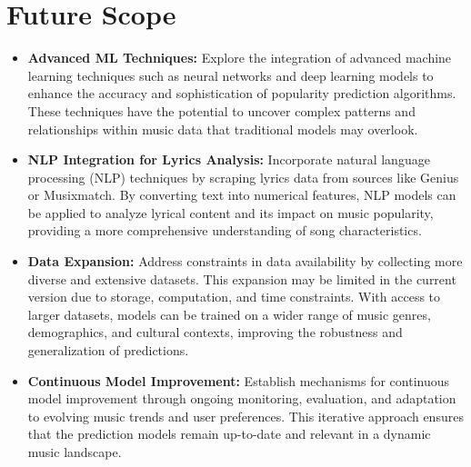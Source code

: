 \documentclass[11pt]{report}
\begin{document}
\chapter{Future Scope}

\begin{itemize}
\item \textbf{Advanced ML Techniques:} Explore the integration of advanced machine learning techniques such as neural networks and deep learning models to enhance the accuracy and sophistication of popularity prediction algorithms. These techniques have the potential to uncover complex patterns and relationships within music data that traditional models may overlook.

\item \textbf{NLP Integration for Lyrics Analysis:} Incorporate natural language processing (NLP) techniques by scraping lyrics data from sources like Genius or Musixmatch. By converting text into numerical features, NLP models can be applied to analyze lyrical content and its impact on music popularity, providing a more comprehensive understanding of song characteristics.

\item \textbf{Data Expansion:} Address constraints in data availability by collecting more diverse and extensive datasets. This expansion may be limited in the current version due to storage, computation, and time constraints. With access to larger datasets, models can be trained on a wider range of music genres, demographics, and cultural contexts, improving the robustness and generalization of predictions.

\item \textbf{Continuous Model Improvement:} Establish mechanisms for continuous model improvement through ongoing monitoring, evaluation, and adaptation to evolving music trends and user preferences. This iterative approach ensures that the prediction models remain up-to-date and relevant in a dynamic music landscape.

\end{itemize}

\clearpage

   




\end{document}
